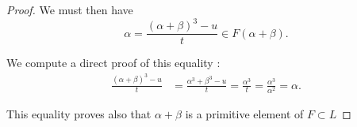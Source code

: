 \documentclass[11pt,a4paper]{article}
\begin{document}
\begin{proof}
We must then have 
$$\alpha = \frac{(\alpha+\beta)^3 - u}{t} \in F(\alpha+\beta).$$

We compute a direct proof of this equality :
\begin{align*}
\frac{(\alpha+\beta)^3 - u}{t} &=\frac{\alpha^3+\beta^3 - u}{t} =\frac{\alpha^3}{t} =\frac{\alpha^3}{\alpha^2}=\alpha.
\end{align*}

This equality proves also that $\alpha + \beta$ is a primitive element of $F \subset L$
\end{proof}
\end{document}
